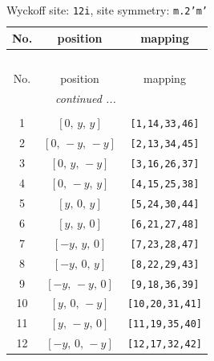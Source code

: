 \documentclass[fleqn,8pt]{jsarticle}
\begin{document}
\begin{longtable}{ccc}
\caption{Wyckoff site: {\tt 12i}, site symmetry: {\tt m.2'm'}}
 \\
 \hline \hline
No. & position & mapping \\ \hline \endfirsthead

\multicolumn{2}{l}{\tablename\ \thetable{}} \\
 \hline \hline
No. & position & mapping \\ \hline \endhead

 \hline \hline
\multicolumn{2}{r}{\footnotesize\it continued ...} \\ \endfoot

 \hline \hline
\multicolumn{2}{r}{} \\ \endlastfoot

1 & $\left[ 0,\, y,\, y \right]$ & {\tt [1,14,33,46]} \\ \hline
2 & $\left[ 0,\, - y,\, - y \right]$ & {\tt [2,13,34,45]} \\ \hline
3 & $\left[ 0,\, y,\, - y \right]$ & {\tt [3,16,26,37]} \\ \hline
4 & $\left[ 0,\, - y,\, y \right]$ & {\tt [4,15,25,38]} \\ \hline
5 & $\left[ y,\, 0,\, y \right]$ & {\tt [5,24,30,44]} \\ \hline
6 & $\left[ y,\, y,\, 0 \right]$ & {\tt [6,21,27,48]} \\ \hline
7 & $\left[ - y,\, y,\, 0 \right]$ & {\tt [7,23,28,47]} \\ \hline
8 & $\left[ - y,\, 0,\, y \right]$ & {\tt [8,22,29,43]} \\ \hline
9 & $\left[ - y,\, - y,\, 0 \right]$ & {\tt [9,18,36,39]} \\ \hline
10 & $\left[ y,\, 0,\, - y \right]$ & {\tt [10,20,31,41]} \\ \hline
11 & $\left[ y,\, - y,\, 0 \right]$ & {\tt [11,19,35,40]} \\ \hline
12 & $\left[ - y,\, 0,\, - y \right]$ & {\tt [12,17,32,42]} \\
\end{longtable}
\renewcommand{\arraystretch}{1.2}
\end{document}
